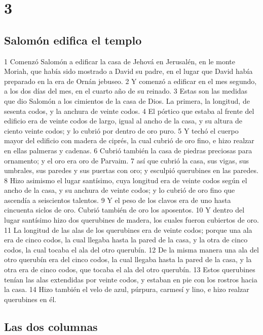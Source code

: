 \chapter{3}

\section*{Salomón edifica el templo }


1 Comenzó Salomón a edificar la casa de Jehová en Jerusalén, en le monte Moriah, que había sido mostrado a David su padre, en el lugar que David había preparado en la era de Ornán jebuseo.
2 Y comenzó a edificar en el mes segundo, a los dos días del mes, en el cuarto año de su reinado.
3 Estas son las medidas que dio Salomón a los cimientos de la casa de Dios. La primera, la longitud, de sesenta codos,  y la anchura de veinte codos.
4 El pórtico que estaba al frente del edificio era de veinte codos   de largo, igual al ancho de la casa, y su altura de ciento veinte codos; y lo cubrió por dentro de oro puro.
5 Y techó el cuerpo mayor del edificio con madera de ciprés, la cual cubrió de oro fino, e hizo realzar en ellas palmeras y cadenas.
6 Cubrió también la casa de piedras preciosas para ornamento; y el oro era oro de Parvaim.
7 así que cubrió la casa, sus vigas, sus umbrales, sus paredes y sus puertas con oro; y esculpió querubines en las paredes.
8 Hizo asimismo el lugar santísimo, cuya longitud era de veinte codos   según el ancho de la casa, y su anchura de veinte codos; y lo cubrió de oro fino que ascendía a seiscientos talentos.
9 Y el peso de los clavos era de uno hasta cincuenta siclos de oro.  Cubrió también de oro los aposentos.
10 Y dentro del lugar santísimo hizo dos querubines de madera, los cuales fueron cubiertos de oro.
11 La longitud de las alas de los querubines era de veinte codos;  porque una ala era de cinco codos, la cual llegaba hasta la pared de la casa, y la otra de cinco codos, la cual tocaba el ala del otro querubín.
12 De la misma manera una ala del otro querubín era del cinco codos,  la cual llegaba hasta la pared de la casa, y la otra era de cinco codos, que tocaba el ala del otro querubín.
13 Estos querubines tenían las alas extendidas por veinte codos,  y estaban en pie con los rostros hacia la casa.
14 Hizo también el velo de azul, púrpura, carmesí y lino, e hizo realzar querubines en él.
\section*{Las dos columnas }

